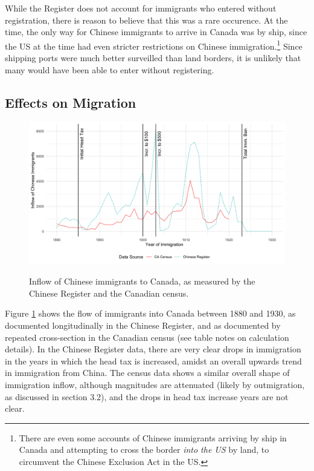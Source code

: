 \documentclass[12pt]{article}
\begin{document}
While the Register does not account for immigrants who entered without registration, there is reason to believe that this was a rare occurence. At the time, the only way for Chinese immigrants to arrive in Canada was by ship, since the US at the time had even stricter restrictions on Chinese immigration.\footnote{There are even some accounts of Chinese immigrants arriving by ship in Canada and attempting to cross the border \textit{into the US }by land, to circumvent the Chinese Exclusion Act in the US.} Since shipping ports were much better surveilled than land borders, it is unlikely that many would have been able to enter without registering. 


\subsection{Effects on Migration}

\begin{figure}
    \centering 
    \caption{Inflow of Chinese immigrants to Canada, as measured by the Chinese Register and the Canadian census.}
    \includegraphics[width=\textwidth]{../../figs/fig2_flow.png}
    \label{fig:inflow}
\end{figure}

Figure \ref{fig:inflow} shows the flow of immigrants into Canada between 1880 and 1930, as documented longitudinally in the Chinese Register, and as documented by repeated cross-section in the Canadian census (see table notes on calculation details). In the Chinese Register data, there are very clear drops in immigration in the years in which the head tax is increased, amidst an overall upwards trend in immigration from China. The census data shows a similar overall shape of immigration inflow, although magnitudes are attenuated (likely by outmigration, as discussed in section 3.2), and the drops in head tax increase years are not clear.  
\end{document}
